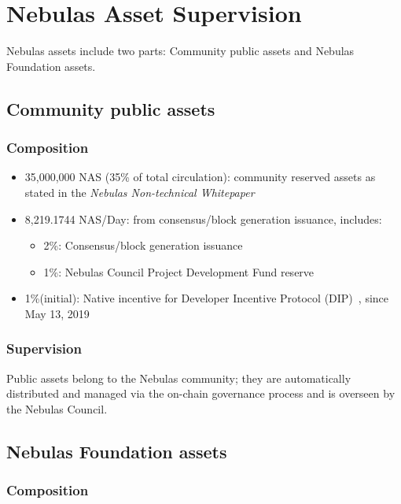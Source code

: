 \section{Nebulas Asset Supervision}

\label{supervision}

Nebulas assets include two parts: Community public assets and Nebulas Foundation assets.

\subsection{Community public assets}

\subsubsection{Composition}

\begin{itemize}
	\item 35,000,000 NAS (35\% of total circulation): community reserved assets as stated in the \textit{Nebulas Non-technical Whitepaper}
    \item 8,219.1744 NAS/Day: from consensus/block generation issuance, includes:
	    \begin{itemize}
			\item 2\%: Consensus/block generation issuance
			\item 1\%: Nebulas Council Project Development Fund reserve
		\end{itemize}
	\item 1\%(initial): Native incentive for Developer Incentive Protocol (DIP)~\cite{mauvepaper}, since May 13, 2019
\end{itemize}

\subsubsection{Supervision}

Public assets belong to the Nebulas community; they are automatically distributed and managed via the on-chain governance process and is overseen by the Nebulas Council.

\subsection{Nebulas Foundation assets}

\subsubsection{Composition}

